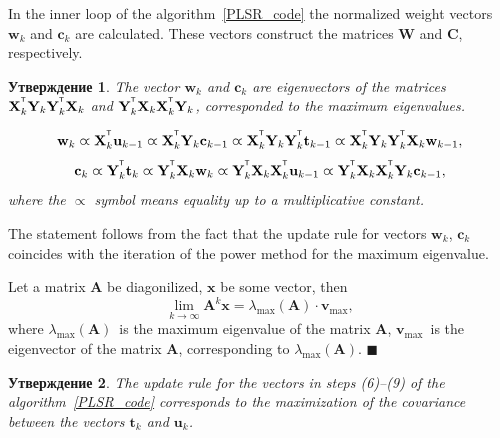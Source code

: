 \documentclass[12pt,twoside]{article}
\newtheorem{statement}{Утверждение}
\newcommand{\bx}{\mathbf{x}}
\newcommand{\bw}{\mathbf{w}}
\newcommand{\bY}{\mathbf{Y}}
\newcommand{\bX}{\mathbf{X}}
\newcommand{\bu}{\mathbf{u}}
\newcommand{\bt}{\mathbf{t}}
\newcommand{\bc}{\mathbf{c}}
\newcommand{\bC}{\mathbf{C}}
\newcommand{\bW}{\mathbf{W}}
\newcommand{\T}{^{\text{\tiny\sffamily\upshape\mdseries T}}}
\begin{document}
In the inner loop of the algorithm~\ref{PLSR_code} the normalized weight vectors $\bw_k$ and $\bc_k$ are calculated. 
These vectors construct the matrices $\bW$ and $\bC$, respectively.

\begin{statement}
	The vector $\bw_k$ and $\bc_k$ are eigenvectors of the matrices $\bX_k^{\T} \bY_k \bY_k^{\T} \bX_k$ and $\bY_k^{\T} \bX_k \bX_k^{\T} \bY_k$, corresponded to the maximum eigenvalues.
	
	\begin{equation*}
	\bw_k \varpropto \bX_k^{\T} \bu_{k-1} \varpropto \bX_k^{\T} \bY_k \bc_{k-1} \varpropto \bX_k^{\T} \bY_k \bY_k^{\T} \bt_{k-1} \varpropto \bX_k^{\T} \bY_k \bY_k^{\T} \bX_k \bw_{k-1},
	\end{equation*}
	\begin{equation*}
	\bc_k \varpropto \bY_k^{\T} \bt_k \varpropto \bY_k^{\T} \bX_k \bw_k \varpropto \bY_k^{\T} \bX_k \bX_k^{\T} \bu_{k-1} \varpropto \bY_k^{\T} \bX_k \bX_k^{\T} \bY_k \bc_{k-1},
	\end{equation*}
	where the $\varpropto$ symbol means equality up to a multiplicative constant.
	\label{st::eig}
\end{statement}

The statement follows from the fact that the update rule for vectors $\bw_k$, $\bc_k$ coincides with the iteration of the power method for the maximum eigenvalue.

Let a matrix $\mathbf{A}$ be diagonilized, $\bx$ be some vector, then
\[
	\lim_{k \rightarrow \infty} \mathbf{A}^k \bx = \lambda_{\max}(\mathbf{A}) \cdot \mathbf{v}_{\max},
\]
where $ \lambda_{\max} (\mathbf{A})$~is the maximum eigenvalue of the matrix $\mathbf{A}$, $\mathbf{v}_{\max}$~is the eigenvector of the matrix $\mathbf{A}$, corresponding to $ \lambda_{\max} (\mathbf{A})$.
$\blacksquare$

\begin{statement}

The update rule for the vectors in steps (6)--(9) of the algorithm~\ref{PLSR_code} corresponds to the maximization of the covariance between the vectors $\bt_k$ and $\bu_k$.
\end{statement}
\end{document}
